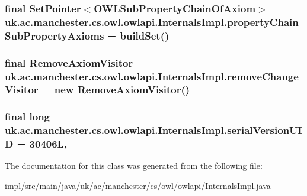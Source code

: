 \hypertarget{classuk_1_1ac_1_1manchester_1_1cs_1_1owl_1_1owlapi_1_1_internals_impl_a0f97044cc915ecbf6cda0522ade7223b}{
\subsubsection[{property\-Chain\-Sub\-Property\-Axioms}]{\setlength{\rightskip}{0pt plus 5cm}final Set\-Pointer$<${\bf O\-W\-L\-Sub\-Property\-Chain\-Of\-Axiom}$>$ uk.\-ac.\-manchester.\-cs.\-owl.\-owlapi.\-Internals\-Impl.\-property\-Chain\-Sub\-Property\-Axioms = build\-Set()\hspace{0.3cm}{\ttfamily [protected]}}}\label{classuk_1_1ac_1_1manchester_1_1cs_1_1owl_1_1owlapi_1_1_internals_impl_a0f97044cc915ecbf6cda0522ade7223b}
\hypertarget{classuk_1_1ac_1_1manchester_1_1cs_1_1owl_1_1owlapi_1_1_internals_impl_a26feeb9d88883c6ab83e3f71248ea7e7}{
\subsubsection[{remove\-Change\-Visitor}]{\setlength{\rightskip}{0pt plus 5cm}final Remove\-Axiom\-Visitor uk.\-ac.\-manchester.\-cs.\-owl.\-owlapi.\-Internals\-Impl.\-remove\-Change\-Visitor = new Remove\-Axiom\-Visitor()\hspace{0.3cm}{\ttfamily [private]}}}\label{classuk_1_1ac_1_1manchester_1_1cs_1_1owl_1_1owlapi_1_1_internals_impl_a26feeb9d88883c6ab83e3f71248ea7e7}
\hypertarget{classuk_1_1ac_1_1manchester_1_1cs_1_1owl_1_1owlapi_1_1_internals_impl_a115b5916b494e74c7258fe707e670704}{
\subsubsection[{serial\-Version\-U\-I\-D}]{\setlength{\rightskip}{0pt plus 5cm}final long uk.\-ac.\-manchester.\-cs.\-owl.\-owlapi.\-Internals\-Impl.\-serial\-Version\-U\-I\-D = 30406\-L\hspace{0.3cm}{\ttfamily [static]}, {\ttfamily [private]}}}\label{classuk_1_1ac_1_1manchester_1_1cs_1_1owl_1_1owlapi_1_1_internals_impl_a115b5916b494e74c7258fe707e670704}


The documentation for this class was generated from the following file\-:\begin{DoxyCompactItemize}
\item 
impl/src/main/java/uk/ac/manchester/cs/owl/owlapi/\hyperlink{_internals_impl_8java}{Internals\-Impl.\-java}\end{DoxyCompactItemize}
